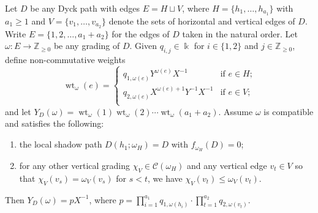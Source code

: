 \documentclass[ALCO,ThmDefs,Unicode,epreuves]{cedram}
\newcommand{\cC}{\mathcal{C}}
\newcommand{\kk}{\Bbbk}
\newcommand{\ZZ}{\mathbb{Z}}
\DeclareMathOperator{\wt}{wt}
\begin{document}
\begin{proposition}
 \label{prop:noncommutative collapse}
 Let $D$ be any Dyck path with edges $E=H\sqcup V$, where $H=\{h_1,\ldots,h_{a_1}\}$ with $a_1\ge1$ and $V=\{v_1,\ldots,v_{a_2}\}$ denote the sets of horizontal and vertical edges of $D$. 
 Write $E=\{1,2,\ldots,a_1+a_2\}$ for the edges of $D$ taken in the natural order.
 Let $\omega:E\to\ZZ_{\ge0}$ be any grading of $D$.
 Given $q_{i,j}\in\kk$ for $i\in\{1,2\}$ and $j\in\ZZ_{\ge0}$, define non-commutative weights
 \begin{equation}
 \label{eq:general edge weights}
 \wt_\omega(e)=\begin{cases}
 q_{1,\omega(e)}Y^{\omega(e)}X^{-1} & \text{if $e\in H$;}\\
 q_{2,\omega(e)}X^{\omega(e)+1}Y^{-1}X^{-1} & \text{if $e\in V$;}\\
 \end{cases}
 \end{equation}
 and let $Y_D(\omega)=\wt_\omega(1)\wt_\omega(2)\cdots\wt_\omega(a_1+a_2)$.
 Assume $\omega$ is compatible and satisfies the following:
 \begin{enumerate}
 \item\label{prop4.1_1} the local shadow path $D(h_1;\omega_H)=D$ with $f_{\omega_H}(D)=0$;
 \item\label{prop4.1_2} for any other vertical grading $\chi_V\in\cC(\omega_H)$ and any vertical edge $v_t\in V$ so that $\chi_V(v_s)=\omega_V(v_s)$ for $s<t$, we have $\chi_V(v_t)\le\omega_V(v_t)$.
 \end{enumerate}
 Then $Y_D(\omega)=pX^{-1}$, where $p=\prod_{i=1}^{a_1}q_{1,\omega(h_i)}\cdot\prod_{t=1}^{a_2}q_{2,\omega(v_t)}$.
\end{proposition}
\end{document}
